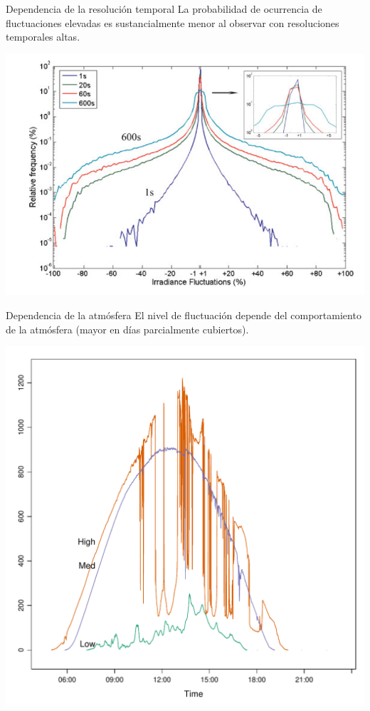\documentclass[aspectratio=169, usenames,svgnames,dvipsnames]{beamer}
\begin{document}
\begin{frame}[label={sec:org19b19d9}]{Dependencia de la resolución temporal}
La probabilidad de ocurrencia de fluctuaciones elevadas es
sustancialmente menor al observar con resoluciones temporales
altas.

\begin{center}
\includegraphics[height=0.75\textheight]{../figs/FluctuacionIrradiancia_Marcosetal2011.png}
\end{center}
\end{frame}

\begin{frame}[label={sec:org82c7296}]{Dependencia de la atmósfera}
El nivel de fluctuación depende del comportamiento de la atmósfera
(mayor en días parcialmente cubiertos).

\begin{center}
\includegraphics[height=0.8\textheight]{../figs/radLowMedHigh.pdf}
\end{center}
\end{frame}
\end{document}
